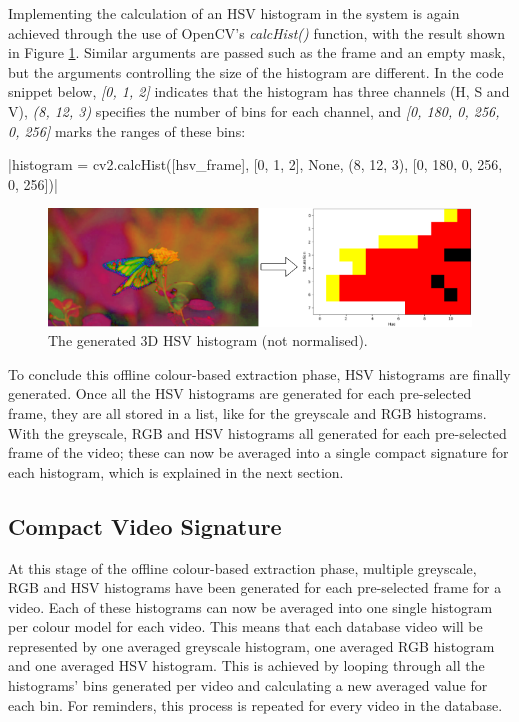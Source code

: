 Implementing the calculation of an HSV histogram in the system is again achieved through the use of OpenCV's \textit{calcHist()} function, with the result shown in Figure \ref{fig:implementation-hsv_not_normalised}. Similar arguments are passed such as the frame and an empty mask, but the arguments controlling the size of the histogram are different. In the code snippet below, \textit{[0, 1, 2]} indicates that the histogram has three channels (H, S and V), \textit{(8, 12, 3)} specifies the number of bins for each channel, and \textit{[0, 180, 0, 256, 0, 256]} marks the ranges of these bins:

|histogram = cv2.calcHist([hsv_frame], [0, 1, 2], None, (8, 12, 3), [0, 180, 0, 256, 0, 256])|

\begin{figure}[h] 
\centerline{\includegraphics[width=\textwidth]{figures/implementation/hsv_not_normalised.png}}
\caption{\label{fig:implementation-hsv_not_normalised}The generated 3D HSV histogram (not normalised).}
\end{figure}

To conclude this offline colour-based extraction phase, HSV histograms are finally generated. Once all the HSV histograms are generated for each pre-selected frame, they are all stored in a list, like for the greyscale and RGB histograms. With the greyscale, RGB and HSV histograms all generated for each pre-selected frame of the video; these can now be averaged into a single compact signature for each histogram, which is explained in the next section.


\subsection{Compact Video Signature}
\label{sec:implementation-compact-video-signature}

At this stage of the offline colour-based extraction phase, multiple greyscale, RGB and HSV histograms have been generated for each pre-selected frame for a video. Each of these histograms can now be averaged into one single histogram per colour model for each video. This means that each database video will be represented by one averaged greyscale histogram, one averaged RGB histogram and one averaged HSV histogram. This is achieved by looping through all the histograms' bins generated per video and calculating a new averaged value for each bin. For reminders, this process is repeated for every video in the database.\\

